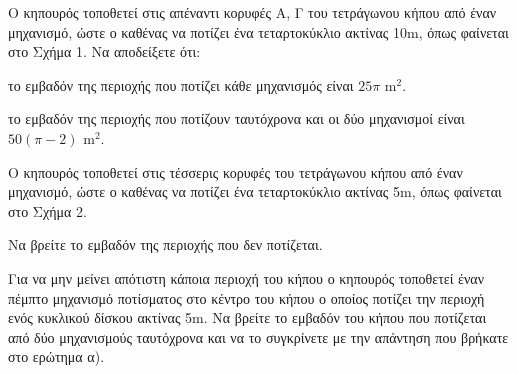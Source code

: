 \begin{alist}
    \item Ο κηπουρός τοποθετεί στις απέναντι κορυφές Α, Γ του τετράγωνου κήπου από έναν μηχανισμό, ώστε ο καθένας να ποτίζει ένα τεταρτοκύκλιο ακτίνας 10m, όπως φαίνεται στο Σχήμα 1. Να αποδείξετε ότι:
    \begin{rlist}
        \item το εμβαδόν της περιοχής που ποτίζει κάθε μηχανισμός είναι $25\pi \text{ m}^2$. 
        \item το εμβαδόν της περιοχής που ποτίζουν ταυτόχρονα και οι δύο μηχανισμοί είναι $50(\pi - 2) \text{ m}^2$. 
    \end{rlist}
    \item Ο κηπουρός τοποθετεί στις τέσσερις κορυφές του τετράγωνου κήπου από έναν μηχανισμό, ώστε ο καθένας να ποτίζει ένα τεταρτοκύκλιο ακτίνας 5m, όπως φαίνεται στο Σχήμα 2.
    \begin{rlist}
        \item Να βρείτε το εμβαδόν της περιοχής που δεν ποτίζεται. 
        \item Για να μην μείνει απότιστη κάποια περιοχή του κήπου ο κηπουρός τοποθετεί έναν πέμπτο μηχανισμό ποτίσματος στο κέντρο του κήπου ο οποίος ποτίζει την περιοχή ενός κυκλικού δίσκου ακτίνας 5m. Να βρείτε το εμβαδόν του κήπου που ποτίζεται από δύο μηχανισμούς ταυτόχρονα και να το συγκρίνετε με την απάντηση που βρήκατε στο ερώτημα α). 
    \end{rlist}
\end{alist}